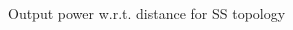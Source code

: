 
\begin{figure}[h]
\centering
\begin{subfigmatrix}{2} 
\end{subfigmatrix}
\end{figure}
\begin{figure}[H]
\centering
\begin{subfigmatrix}{1} 
\end{subfigmatrix}
\caption{Output power w.r.t. distance for SS topology}
\end{figure}

